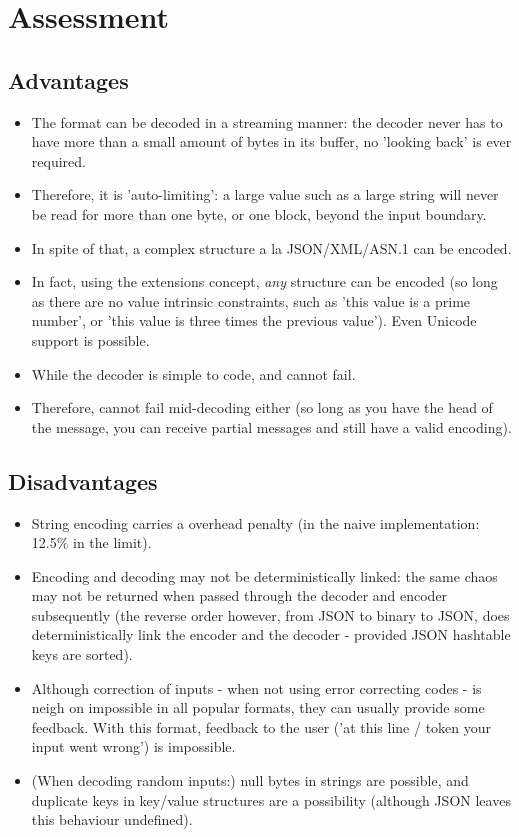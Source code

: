 \section{Assessment}

\subsection{Advantages}

\begin{itemize}
\item The format can be decoded in a streaming manner: the decoder never
      has to have
      more than a small amount of bytes in its buffer, no 'looking back' is
      ever required.
\item Therefore, it is 'auto-limiting': a large value such as a large string
      will never be read for more than one byte, or one block, beyond the
      input boundary.
\item In spite of that, a complex structure a la JSON/XML/ASN.1 can be
      encoded.
\item In fact, using the extensions concept, \textit{any} structure can
      be encoded (so long as there are no value intrinsic constraints, such
      as 'this value is a prime number', or 'this value is three times the
      previous value'). Even Unicode support is possible.
\item While the decoder is simple to code, and cannot fail.
\item Therefore, cannot fail mid-decoding either (so long as you have the
      head of the message, you can receive
      partial messages and still have a valid encoding).
\end{itemize}

\subsection{Disadvantages}

\begin{itemize}
\item String encoding carries a overhead penalty
      (in the naive implementation: 12.5\% in the limit).
\item Encoding and decoding may not be deterministically linked: the same
      chaos may not be returned when passed through the decoder and encoder
      subsequently (the reverse order however, from JSON to binary to JSON,
      does deterministically link the encoder and the decoder - provided
      JSON hashtable keys are sorted).
\item Although correction of inputs - when not using error correcting codes -
      is neigh on impossible in all popular formats, they can usually
      provide some feedback. With this format, feedback to the user
      ('at this line / token your input went wrong') is impossible.
\item (When decoding random inputs:) null bytes in strings are possible,
      and duplicate
      keys in key/value structures are a possibility (although JSON
      leaves this behaviour undefined).
\end{itemize}
